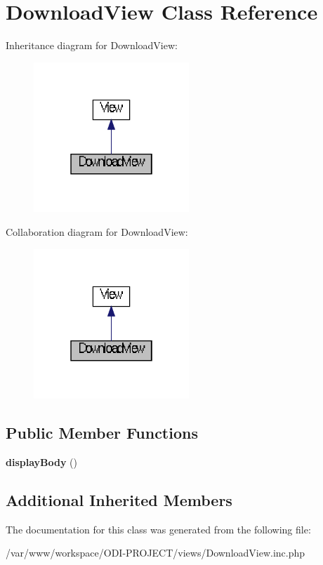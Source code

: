 \section{Download\+View Class Reference}
\label{class_download_view}


Inheritance diagram for Download\+View\+:\nopagebreak
\begin{figure}[H]
\begin{center}
\leavevmode
\includegraphics[width=166pt]{class_download_view__inherit__graph}
\end{center}
\end{figure}


Collaboration diagram for Download\+View\+:\nopagebreak
\begin{figure}[H]
\begin{center}
\leavevmode
\includegraphics[width=166pt]{class_download_view__coll__graph}
\end{center}
\end{figure}
\subsection*{Public Member Functions}
\begin{DoxyCompactItemize}
\item 
{\bfseries display\+Body} ()\label{class_download_view_a40b09eae1ecbd17cdbc914fe587f186f}

\end{DoxyCompactItemize}
\subsection*{Additional Inherited Members}


The documentation for this class was generated from the following file\+:\begin{DoxyCompactItemize}
\item 
/var/www/workspace/\+O\+D\+I-\/\+P\+R\+O\+J\+E\+C\+T/views/Download\+View.\+inc.\+php\end{DoxyCompactItemize}
